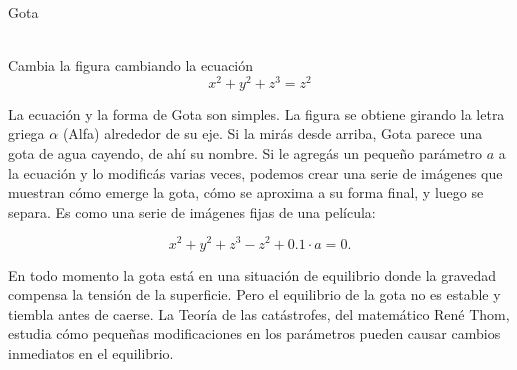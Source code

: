 \documentclass[es]{SurferDesc}%
\begin{document}
\footnotesize

\begin{surferPage}
  \begin{surferTitle}Gota\end{surferTitle}  \\
Cambia la figura cambiando la ecuación\\

\smallskip
\[x^2	+ y^2	+ z^3	= z^2\]

\singlespacing
La ecuación y la forma de Gota son simples. La figura se obtiene girando la letra griega $\alpha$ (Alfa) alrededor de su eje. Si la mirás desde arriba, Gota parece una gota de agua cayendo, de ahí su nombre.
\newline
Si le agregás un pequeño parámetro $a$ a la ecuación y lo modificás varias veces, podemos crear una serie de imágenes que muestran cómo emerge la gota, cómo se aproxima a su forma final, y luego se separa. Es como una serie de imágenes fijas de una película: 

\[x^2	+ y^2	+ z^3	-z^2+0.1\cdot a=0.\]

En todo momento la gota está en una situación de equilibrio donde la gravedad compensa la tensión de la superficie. Pero el equilibrio de la gota no es estable y tiembla antes de caerse. La Teoría de las catástrofes, del matemático Ren\'e Thom, estudia cómo pequeñas modificaciones en los parámetros pueden causar cambios inmediatos en el equilibrio.


  \begin{surferText}
     \end{surferText}
\end{surferPage}


\end{document}
